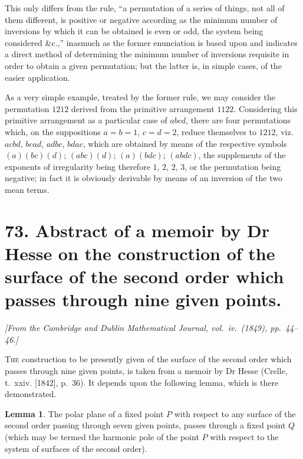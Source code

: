 \documentclass[11pt,a4paper]{article}
\theoremstyle{definition}
\newtheorem*{lemma}{Lemma}
\begin{document}
This only differs from the rule, ``a permutation of a series of things, not all of them different, is positive or negative according as the minimum number of inversions by which it can be obtained is even or odd, the system being considered \&c.,'' inasmuch as the former enunciation is based upon and indicates a direct method of determining the minimum number of inversions requisite in order to obtain a given permutation; but the latter is, in simple cases, of the easier application.

As a very simple example, treated by the former rule, we may consider the permutation $1212$ derived from the primitive arrangement $1122$. Considering this primitive arrangement as a particular case of $abcd$, there are four permutations which, on the suppositions $a = b = 1$, $c = d = 2$, reduce themselves to $1212$, viz.\ $acbd$, $bcad$, $adbc$, $bdac$, which are obtained by means of the respective symbols $(a)(bc)(d)$; $(abc)(d)$; $(a)(bdc)$; $(abdc)$, the supplements of the exponents of irregularity being therefore $1$, $2$, $2$, $3$, or the permutation being negative; in fact it is obviously derivable by means of an inversion of the two mean terms.



\newpage
\section*{73. Abstract of a memoir by Dr Hesse on the construction of the surface of the second order which passes through nine given points.}

\begin{flushright}
\textit{[From the Cambridge and Dublin Mathematical Journal, vol.\ iv.\ (1849), pp.\ 44--46.]}
\end{flushright}

\setcounter{page}{425}

\textsc{The} construction to be presently given of the surface of the second order which passes through nine given points, is taken from a memoir by Dr Hesse (Crelle, t.~xxiv. [1842], p.~36). It depends upon the following lemma, which is there demonstrated.

\begin{lemma}
The polar plane of a fixed point $P$ with respect to any surface of the second order passing through seven given points, passes through a fixed point $Q$ (which may be termed the harmonic pole of the point $P$ with respect to the system of surfaces of the second order).
\end{lemma}
\end{document}
